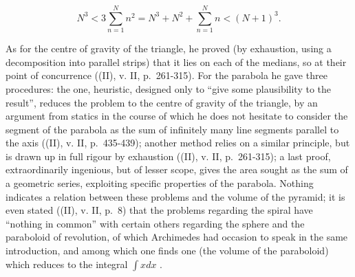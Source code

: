 \[
N ^ {3} <   3 \sum_ {n = 1} ^ {N} n ^ {2} = N ^ {3} + N ^ {2} + \sum_ {n = 1} ^ {N} n <   (N + 1) ^ {3}.
\]

As for the centre of gravity of the triangle, he proved (by exhaustion, using a decomposition into parallel strips) that it lies on each of the medians, so at their point of concurrence ((II), v. II, p.~261-315). For the parabola he gave three procedures: the one, heuristic, designed only to ``give some plausibility to the result'', reduces the problem to the centre of gravity of the triangle, by an argument from statics in the course of which he does not hesitate to consider the segment of the parabola as the sum of infinitely many line segments parallel to the axis ((II), v. II, p.~435-439); another method relies on a similar principle, but is drawn up in full rigour by exhaustion ((II), v. II, p.~261-315); a last proof, extraordinarily ingenious, but of lesser scope, gives the area sought as the sum of a geometric series, exploiting specific properties of the parabola. Nothing indicates a relation between these problems and the volume of the pyramid; it is even stated ((II), v. II, p.~8) that the problems regarding the spiral have ``nothing in common'' with certain others regarding the sphere and the paraboloid of revolution, of which Archimedes had occasion to speak in the same introduction, and among which one finds one (the volume of the paraboloid) which reduces to the integral \(\int x dx\) .

